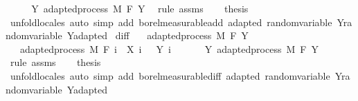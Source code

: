 \begin{isabellebody}
\ {\isacharminus}{\kern0pt}\isanewline
\ \ \isamarkupfalse%
\ Y{\isacharcolon}{\kern0pt}\ adapted{\isacharunderscore}{\kern0pt}process\ M\ F\ Y\ \isamarkupfalse%
\ {\isacharparenleft}{\kern0pt}rule\ assms{\isacharparenright}{\kern0pt}\isanewline
\ \ \isamarkupfalse%
\ {\isacharquery}{\kern0pt}thesis\ \isamarkupfalse%
\ {\isacharparenleft}{\kern0pt}unfold{\isacharunderscore}{\kern0pt}locales{\isacharparenright}{\kern0pt}\ {\isacharparenleft}{\kern0pt}auto\ simp\ add{\isacharcolon}{\kern0pt}\ borel{\isacharunderscore}{\kern0pt}measurable{\isacharunderscore}{\kern0pt}add\ adapted\ random{\isacharunderscore}{\kern0pt}variable\ Y{\isachardot}{\kern0pt}random{\isacharunderscore}{\kern0pt}variable\ Y{\isachardot}{\kern0pt}adapted{\isacharparenright}{\kern0pt}\isanewline
{}\isamarkupfalse%
%
\endisatagproof
{\isafoldproof}%
%
\isadelimproof
\isanewline
%
\endisadelimproof
\isanewline
{}\isamarkupfalse%
\ diff{\isacharcolon}{\kern0pt}\isanewline
\ \ \ {\isachardoublequoteopen}adapted{\isacharunderscore}{\kern0pt}process\ M\ F\ Y{\isachardoublequoteclose}\isanewline
\ \ \ {\isachardoublequoteopen}adapted{\isacharunderscore}{\kern0pt}process\ M\ F\ {\isacharparenleft}{\kern0pt}{\isasymlambda}i\ {\isasymxi}{\isachardot}{\kern0pt}\ X\ i\ {\isasymxi}\ {\isacharminus}{\kern0pt}\ Y\ i\ {\isasymxi}{\isacharparenright}{\kern0pt}{\isachardoublequoteclose}\isanewline
%
\isadelimproof
%
\endisadelimproof
%
\isatagproof
{}\isamarkupfalse%
\ {\isacharminus}{\kern0pt}\isanewline
\ \ \isamarkupfalse%
\ Y{\isacharcolon}{\kern0pt}\ adapted{\isacharunderscore}{\kern0pt}process\ M\ F\ Y\ \isamarkupfalse%
\ {\isacharparenleft}{\kern0pt}rule\ assms{\isacharparenright}{\kern0pt}\isanewline
\ \ \isamarkupfalse%
\ {\isacharquery}{\kern0pt}thesis\ \isamarkupfalse%
\ {\isacharparenleft}{\kern0pt}unfold{\isacharunderscore}{\kern0pt}locales{\isacharparenright}{\kern0pt}\ {\isacharparenleft}{\kern0pt}auto\ simp\ add{\isacharcolon}{\kern0pt}\ borel{\isacharunderscore}{\kern0pt}measurable{\isacharunderscore}{\kern0pt}diff\ adapted\ random{\isacharunderscore}{\kern0pt}variable\ Y{\isachardot}{\kern0pt}random{\isacharunderscore}{\kern0pt}variable\ Y{\isachardot}{\kern0pt}adapted{\isacharparenright}{\kern0pt}\isanewline
{}\isamarkupfalse%
%
\endisatagproof
{\isafoldproof}%
%
\isadelimproof
\isanewline
%
\endisadelimproof
\isanewline
{}\isamarkupfalse%

\end{isabellebody}
